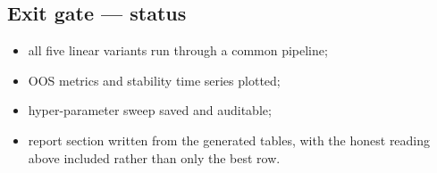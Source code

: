 \subsection{Exit gate --- status}

\begin{itemize}
  \item[\checkmark] all five linear variants run through a common pipeline;
  \item[\checkmark] OOS metrics and stability time series plotted;
  \item[\checkmark] hyper-parameter sweep saved and auditable;
  \item[\checkmark] report section written from the generated tables, with the
    honest reading above included rather than only the best row.
\end{itemize}
